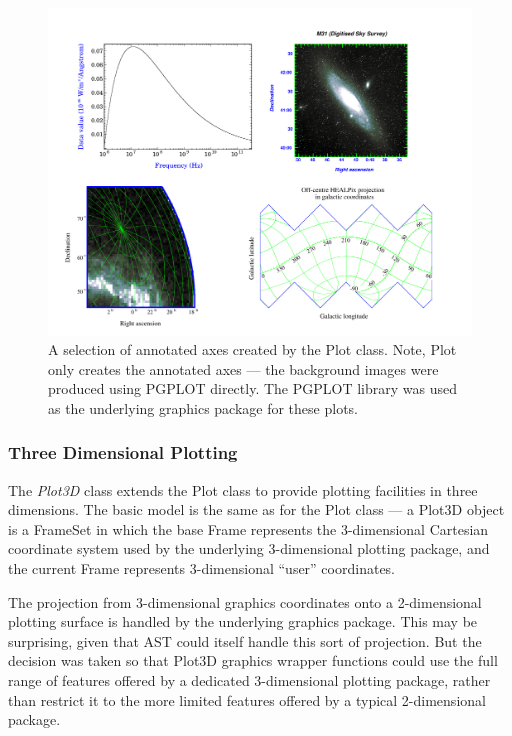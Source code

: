 \documentclass[final,authoryear,5p,times,twocolumn]{elsarticle}
\begin{document}
\begin{figure}[ht]
\centering
\includegraphics[width=\textwidth]{2dplots}
\caption{A selection of annotated axes created by the Plot class. Note,
Plot only creates the annotated axes --- the background images were
produced using PGPLOT directly. The PGPLOT library was used as the
underlying graphics package for these plots.}
\label{fig:2dplots}
\end{figure}

\subsubsection{Three Dimensional Plotting}

The \emph{Plot3D} class extends the Plot class to provide plotting
facilities in three dimensions. The basic model is the same as for the
Plot class --- a Plot3D object is a FrameSet in which the base Frame
represents the 3-dimensional Cartesian coordinate system used by the
underlying 3-dimensional plotting package, and the current Frame
represents 3-dimensional ``user'' coordinates.

The projection from 3-dimensional graphics coordinates onto a
2-dimensional plotting surface is handled by the underlying graphics
package. This may be surprising, given that AST could itself handle this
sort of projection. But the decision was taken so that Plot3D graphics
wrapper functions could use the full range of features offered by a
dedicated 3-dimensional plotting package, rather than restrict it to the
more limited features offered by a typical 2-dimensional package.
\end{document}
